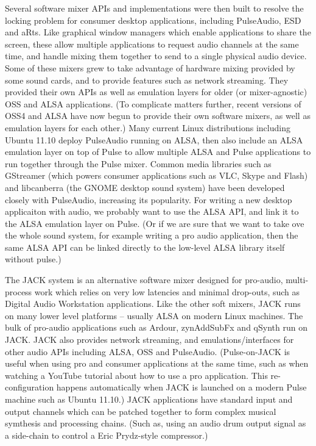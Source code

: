\documentclass[oneside,english]{scrbook}
\begin{document}
Several software mixer APIs and implementations were then built to resolve the locking problem for consumer desktop applications, including PulseAudio, ESD and aRts.  Like graphical window managers which enable applications to share the screen, these allow multiple applications to request audio channels at the same time, and handle mixing them together to send to a single physical audio device.  Some of these mixers grew to take advantage of hardware mixing provided by some sound cards, and to provide features such as network streaming.  They provided their own APIs as well as emulation layers for older (or mixer-agnostic) OSS and ALSA applications.  (To complicate matters further, recent versions of OSS4 and ALSA have now begun to provide their own software mixers, as well as emulation layers for each other.)  Many current Linux distributions including Ubuntu 11.10 deploy PulseAudio running on ALSA, then also include an ALSA emulation layer on top of Pulse to allow multiple ALSA and Pulse applications to run together through the Pulse mixer.  Common media libraries such as GStreamer (which powers consumer applications such as VLC, Skype and Flash) and libcanberra (the GNOME desktop sound system) have been developed closely with PulseAudio, increasing its popularity.  For writing a new desktop applicaiton with audio, we probably want to use the ALSA API, and link it to the ALSA emulation layer on Pulse.  (Or if we are sure that we want to take ove the whole sound system, for example writing a pro audio application, then the same ALSA API can be linked directly to the low-level ALSA library itself without pulse.)

The JACK system is an alternative software mixer designed for pro-audio, multi-process work which relies on very low latencies and minimal drop-outs, such as Digital Audio Workstation applications.  Like the other soft mixers, JACK runs on many lower level platforms -- usually ALSA on modern Linux machines.  The bulk of pro-audio applications such as Ardour, zynAddSubFx and qSynth run on JACK.  JACK also provides network streaming, and emulations/interfaces for other audio APIs including ALSA, OSS and PulseAudio.  (Pulse-on-JACK is useful when using pro and consumer applications at the same time, such as when watching a YouTube tutorial about how to use a pro application.  This re-configuration happens automatically when JACK is launched on a modern Pulse machine such as Ubuntu 11.10.)  JACK applications have standard input and output channels which can be patched together to form complex musical symthesis and processing chains. (Such as, using an audio drum output signal as a side-chain to control a Eric Prydz-style compressor.)
\end{document}
